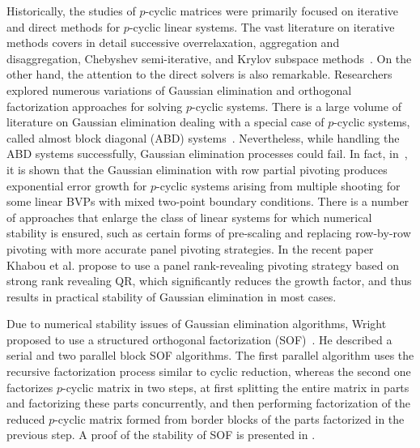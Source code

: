 \documentclass{llncs}
\newcommand{\editDel}[1]{}
\begin{document}
Historically, the studies of $p$-cyclic matrices
were primarily focused on iterative and direct methods for 
$p$-cyclic linear systems. The vast literature on iterative methods 
covers in detail successive overrelaxation,
aggregation and disaggregation,
Chebyshev semi-iterative, 
and Krylov subspace methods~\cite{Ernst00}.
On the other hand, the attention to the direct solvers 
is also remarkable.
Researchers explored numerous variations of Gaussian elimination and 
orthogonal factorization approaches for solving $p$-cyclic systems.
There is a large volume of literature on Gaussian elimination
dealing with a special case of $p$-cyclic systems, 
called almost block diagonal (ABD) systems~\cite{Wright92BSOF}.
Nevertheless, while 
handling %
the ABD systems successfully, 
Gaussian elimination processes could fail.
In fact, in~\cite{Wright93}, it is shown that 
the Gaussian elimination with row partial pivoting %
produces exponential error growth
for $p$-cyclic systems arising from multiple shooting for 
some linear BVPs with mixed two-point boundary conditions. 
There is a number of approaches that enlarge the class of linear systems
for which numerical stability is ensured, 
such as certain forms of pre-scaling
and replacing row-by-row pivoting with 
more accurate panel pivoting strategies.
In the recent paper~\cite{KhabouDGG13} Khabou et al.
propose to use a panel rank-revealing pivoting strategy 
based on strong rank revealing QR, 
which significantly reduces the growth factor, and 
thus results in practical stability of Gaussian elimination
in most cases.

Due to numerical stability issues of Gaussian elimination algorithms, 
Wright proposed to use a structured orthogonal 
factorization (SOF)~\cite{Wright92BSOF}.
He described a serial and two parallel block SOF algorithms. 
The first parallel algorithm uses the recursive factorization 
process similar to cyclic reduction,
whereas the second one factorizes $p$-cyclic matrix in two steps,
at first splitting the entire matrix in parts and factorizing these 
parts concurrently, and then performing factorization of the reduced 
$p$-cyclic matrix formed from border blocks of the parts factorized 
in the previous step.  A proof of the stability of 
SOF is presented in \cite{Wright92BSOF}.
\end{document}
